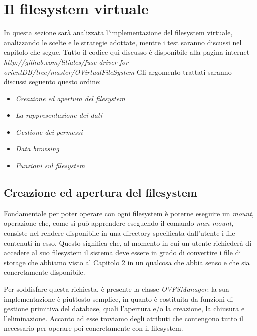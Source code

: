 \section{Il filesystem virtuale}
In questa sezione sarà analizzata l'implementazione del filesystem virtuale, analizzando le scelte e le strategie adottate, mentre i test saranno discussi nel capitolo che segue.
Tutto il codice qui discusso è disponibile alla pagina internet \emph{http://github.com/litiales/fuse-driver-for-orientDB/tree/master/OVirtualFileSystem}
Gli argomento trattati saranno discussi seguento questo ordine:
\begin{itemize}
\item \emph{Creazione ed apertura del filesystem}
\item \emph{La rappresentazione dei dati}
\item \emph{Gestione dei permessi}
\item \emph{Data browsing}
\item \emph{Funzioni sul filesystem}
\end{itemize}

\subsection{Creazione ed apertura del filesystem}
Fondamentale per poter operare con ogni filesystem è poterne eseguire un \emph{mount}, operazione che, come si può apprendere eseguendo il comando \emph{man mount}, consiste nel rendere disponibile in una directory specificata dall'utente i file contenuti in esso. 
Questo significa che, al momento in cui un utente richiederà di accedere al suo filesystem il sistema deve essere in grado di convertire i file di storage che abbiamo visto al Capitolo 2 in un qualcosa che abbia senso e che sia concretamente disponibile.

Per soddisfare questa richiesta, è presente la classe \emph{OVFSManager}: la sua implementazione è piuttosto semplice, in quanto è costituita da funzioni di gestione primitiva del database, quali l'apertura e/o la creazione, la chiusura e l'eliminazione. Accanto ad esse troviamo degli atributi che contengono tutto il necessario per operare poi concretamente con il filesystem.

